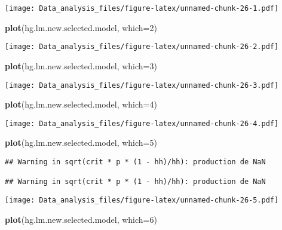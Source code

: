 \documentclass[12pt,]{article}
\newenvironment{Shaded}{\begin{snugshade}}{\end{snugshade}}
\newcommand{\KeywordTok}[1]{\textcolor[rgb]{0.13,0.29,0.53}{\textbf{#1}}}
\newcommand{\DataTypeTok}[1]{\textcolor[rgb]{0.13,0.29,0.53}{#1}}
\newcommand{\DecValTok}[1]{\textcolor[rgb]{0.00,0.00,0.81}{#1}}
\newcommand{\NormalTok}[1]{#1}
\begin{document}
\texttt{[image: Data\_analysis\_files/figure-latex/unnamed-chunk-26-1.pdf]}

\begin{Shaded}
\begin{Highlighting}[]
\KeywordTok{plot}\NormalTok{(hg.lm.new.selected.model, }\DataTypeTok{which=}\DecValTok{2}\NormalTok{)}
\end{Highlighting}
\end{Shaded}

\texttt{[image: Data\_analysis\_files/figure-latex/unnamed-chunk-26-2.pdf]}

\begin{Shaded}
\begin{Highlighting}[]
\KeywordTok{plot}\NormalTok{(hg.lm.new.selected.model, }\DataTypeTok{which=}\DecValTok{3}\NormalTok{)}
\end{Highlighting}
\end{Shaded}

\texttt{[image: Data\_analysis\_files/figure-latex/unnamed-chunk-26-3.pdf]}

\begin{Shaded}
\begin{Highlighting}[]
\KeywordTok{plot}\NormalTok{(hg.lm.new.selected.model, }\DataTypeTok{which=}\DecValTok{4}\NormalTok{)}
\end{Highlighting}
\end{Shaded}

\texttt{[image: Data\_analysis\_files/figure-latex/unnamed-chunk-26-4.pdf]}

\begin{Shaded}
\begin{Highlighting}[]
\KeywordTok{plot}\NormalTok{(hg.lm.new.selected.model, }\DataTypeTok{which=}\DecValTok{5}\NormalTok{)}
\end{Highlighting}
\end{Shaded}

\begin{verbatim}
## Warning in sqrt(crit * p * (1 - hh)/hh): production de NaN

## Warning in sqrt(crit * p * (1 - hh)/hh): production de NaN
\end{verbatim}

\texttt{[image: Data\_analysis\_files/figure-latex/unnamed-chunk-26-5.pdf]}

\begin{Shaded}
\begin{Highlighting}[]
\KeywordTok{plot}\NormalTok{(hg.lm.new.selected.model, }\DataTypeTok{which=}\DecValTok{6}\NormalTok{)}
\end{Highlighting}
\end{Shaded}
\end{document}
